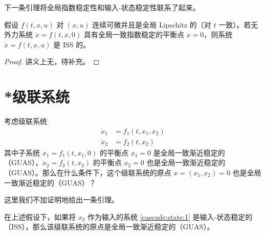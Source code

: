 下一条引理将全局指数稳定性和输入-状态稳定性联系了起来。

\begin{lemma}\label{ISS_lemma}
    假设 $f(t, x, u)$ 对 $(x, u)$ 连续可微并且是全局 Lipschitz 的（对 $t$ 一致）。若无外力系统 $\dot{x} = f (t, x, 0)$ 具有全局一致指数稳定的平衡点 $x = 0$，则系统 $\dot{x} = f (t, x, u)$ 是 ISS 的。
\end{lemma}

\begin{proof}
    讲义上无，待补充。%
\end{proof}


\section*{{*}级联系统}

考虑级联系统
\begin{subequations}
    \begin{align}
        \dot{x}_1 & = f_1 (t, x_1, x_2)  \label{cascade:state:1}\\
        \dot{x}_2 & = f_2 (t, x_2)  \label{cascade:state:2}
    \end{align}
\end{subequations}
其中子系统 $\dot{x}_1 = f_1 (t, x_1, 0)$ 的平衡点 $x_1 = 0$ 是全局一致渐近稳定的（GUAS），$\dot{x}_2 = f_2(t, x_2)$ 的平衡点 $x_2 = 0$ 也是全局一致渐近稳定的（GUAS）。那么在什么条件下，这个级联系统的原点 $x = (x_1, x_2) = 0$ 也是全局一致渐近稳定的（GUAS）？

这里我们不加证明地给出一条引理。
\begin{lemma}
    在上述假设下，如果将 $x_2$ 作为输入的系统 \eqref{cascade:state:1} 是输入-状态稳定的（ISS），那么该级联系统的原点是全局一致渐近稳定的（GUAS）。
\end{lemma}
